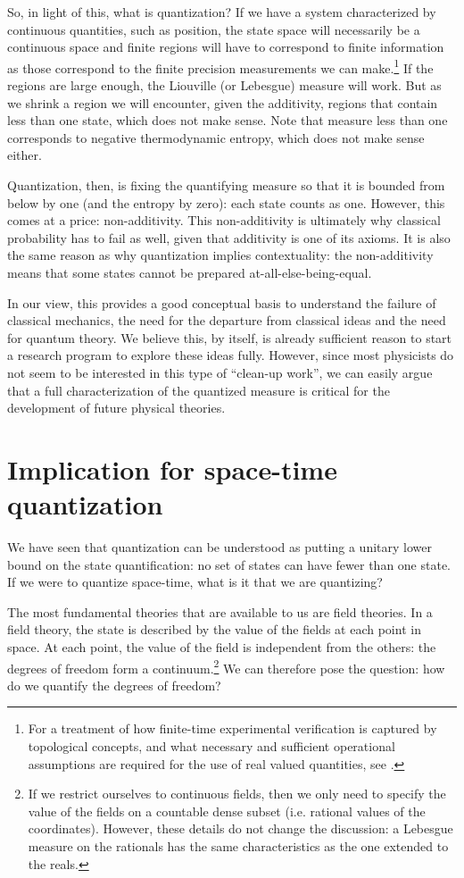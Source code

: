 \documentclass[entropy,article,submit,pdftex,moreauthors]{Definitions/mdpi}
\begin{document}
So, in light of this, what is quantization? If we have a system characterized by continuous quantities, such as position, the state space will necessarily be a continuous space and finite regions will have to correspond to finite information as those correspond to the finite precision measurements we can make.\footnote{For a treatment of how finite-time experimental verification is captured by topological concepts, and what necessary and sufficient operational assumptions are required for the use of real valued quantities, see \cite{kelly1996,aop-book}.} If the regions are large enough, the Liouville (or Lebesgue) measure will work. But as we shrink a region we will encounter, given the additivity, regions that contain less than one state, which does not make sense. Note that measure less than one corresponds to negative thermodynamic entropy, which does not make sense either.

Quantization, then, is fixing the quantifying measure so that it is bounded from below by one (and the entropy by zero): each state counts as one. However, this comes at a price: non-additivity. This non-additivity is ultimately why classical probability has to fail as well, given that additivity is one of its axioms. It is also the same reason as why quantization implies contextuality: the non-additivity means that some states cannot be prepared at-all-else-being-equal.

In our view, this provides a good conceptual basis to understand the failure of classical mechanics, the need for the departure from classical ideas and the need for quantum theory. We believe this, by itself, is already sufficient reason to start a research program to explore these ideas fully. However, since most physicists do not seem to be interested in this type of ``clean-up work'', we can easily argue that a full characterization of the quantized measure is critical for the development of future physical theories.

\section{Implication for space-time quantization}

We have seen that quantization can be understood as putting a unitary lower bound on the state quantification: no set of states can have fewer than one state. If we were to quantize space-time, what is it that we are quantizing?

The most fundamental theories that are available to us are field theories. In a field theory, the state is described by the value of the fields at each point in space. At each point, the value of the field is independent from the others: the degrees of freedom form a continuum.\footnote{If we restrict ourselves to continuous fields, then we only need to specify the value of the fields on a countable dense subset (i.e. rational values of the coordinates). However, these details do not change the discussion: a Lebesgue measure on the rationals has the same characteristics as the one extended to the reals.} We can therefore pose the question: how do we quantify the degrees of freedom?
\end{document}
